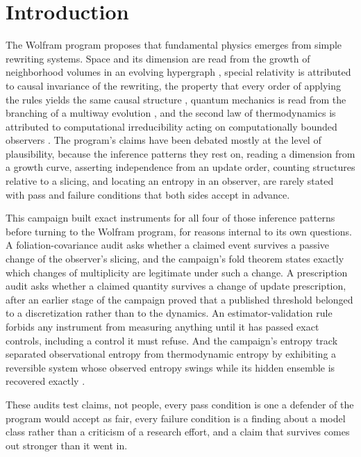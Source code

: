 \documentclass[aps,pre,reprint,nofootinbib]{revtex4-2}
\begin{document}
\maketitle

\section{Introduction}
\label{sec:intro}

The Wolfram program proposes that fundamental physics emerges from
simple rewriting systems.  Space and its dimension are read from the
growth of neighborhood volumes in an evolving hypergraph
\cite{Wolfram2020}, special relativity is attributed to causal
invariance of the rewriting, the property that every order of applying
the rules yields the same causal structure \cite{Gorard2020a}, quantum
mechanics is read from the branching of a multiway evolution
\cite{Gorard2020b}, and the second law of thermodynamics is attributed
to computational irreducibility acting on computationally bounded
observers \cite{Wolfram2023}.  The program's claims have been debated
mostly at the level of plausibility, because the inference patterns
they rest on, reading a dimension from a growth curve, asserting
independence from an update order, counting structures relative to a
slicing, and locating an entropy in an observer, are rarely stated
with pass and failure conditions that both sides accept in advance.

This campaign built exact instruments for all four of those inference
patterns before turning to the Wolfram program, for reasons internal
to its own questions.  A foliation-covariance audit asks whether a
claimed event survives a passive change of the observer's slicing, and
the campaign's fold theorem states exactly which changes of
multiplicity are legitimate under such a change.  A prescription audit
asks whether a claimed quantity survives a change of update
prescription, after an earlier stage of the campaign proved that a
published threshold belonged to a discretization rather than to the
dynamics.  An estimator-validation rule forbids any instrument from
measuring anything until it has passed exact controls, including a
control it must refuse.  And the campaign's entropy track separated
observational entropy from thermodynamic entropy by exhibiting a
reversible system whose observed entropy swings while its hidden
ensemble is recovered exactly \cite{EntropyPaper,SourcesPaper}.

These audits test
claims, not people, every pass condition is one a defender of the
program would accept as fair, every failure condition is a finding
about a model class rather than a criticism of a research effort, and
a claim that survives comes out stronger than it went in.
\end{document}
